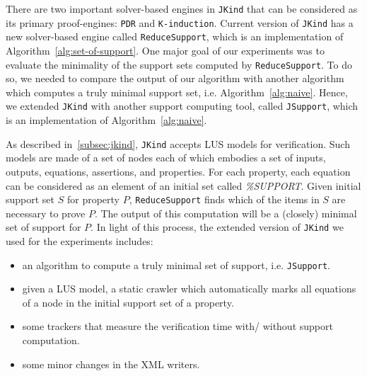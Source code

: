 There are two important solver-based engines in \texttt{JKind} that can be considered as its primary proof-engines: \texttt{PDR} and \texttt{K-induction}. Current version of \texttt{JKind} has a new solver-based engine called \texttt{ReduceSupport},
which is an implementation of Algorithm~\ref{alg:set-of-support}.
One major goal of our experiments was to evaluate the minimality of the support sets computed by \texttt{ReduceSupport}.
To do so, we needed to compare the output of our algorithm with another algorithm
which computes a truly minimal support set, i.e. Algorithm~\ref{alg:naive}. Hence, we extended \texttt{JKind}
with another support computing tool, called \texttt{JSupport}, which is an implementation of Algorithm~\ref{alg:naive}.

As described in~\ref{subsec:jkind}, \texttt{JKind} accepts LUS models for verification.
Such models are made of a set of nodes each of which embodies a set of inputs, outputs, equations, assertions, and properties. For each property, each equation can be considered as an element of an initial set called \textit{\%SUPPORT}. Given initial support set $S$ for property $P$, \texttt{ReduceSupport} finds which of the items in $S$ are necessary to prove $P$. The output of this computation will be a (closely) minimal set of support for $P$. In light of this process, the extended version of \texttt{JKind} we used for the experiments includes:

\begin{itemize}
    \item an algorithm to compute a truly minimal set of support, i.e. \texttt{JSupport}.
    \item given a LUS model, a static crawler which automatically marks all equations of a node in the initial support set of a property.
    \item some trackers that measure the verification time with/ without support computation.
    \item some minor changes in the XML writers.
\end{itemize}

